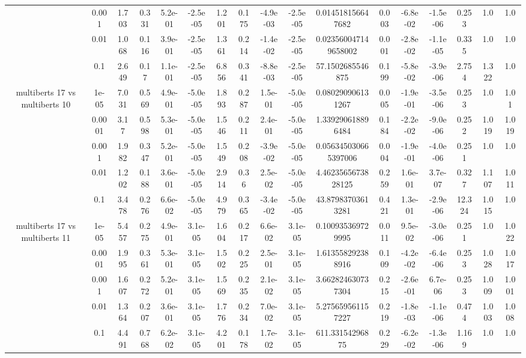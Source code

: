 \begin{tabular}{|c|c|c|c|c|c|c|c|c|c|c|c|c|c|c|c|c|}
 & 0.001 & 1.703 & 0.331 & 5.2e-01 & -2.5e-05 & 1.201 & 0.175 & -4.9e-03 & -2.5e-05 & 0.014518156647682 & 0.003 & -6.8e-02 & -1.5e-06 & 0.253 & 1.0 & 1.0 \\
 & 0.01 & 1.068 & 0.116 & 3.9e-01 & -2.5e-05 & 1.361 & 0.214 & -1.4e-02 & -2.5e-05 & 0.023560047149658002 & 0.001 & -2.8e-02 & -1.1e-05 & 0.335 & 1.0 & 1.0 \\
 & 0.1 & 2.649 & 0.17 & 1.1e-01 & -2.5e-05 & 6.856 & 0.341 & -8.8e-03 & -2.5e-05 & 57.1502685546875 & 0.199 & -5.8e-02 & -3.9e-06 & 2.754 & 1.322 & 1.0 \\
\hline
\multirow{5}{*}{multiberts 17 vs multiberts 10} & 1e-05 & 7.031 & 0.569 & 4.9e-01 & -5.0e-05 & 1.893 & 0.287 & 1.5e-01 & -5.0e-05 & 0.080290906131267 & 0.005 & -1.9e-01 & -3.5e-06 & 0.253 & 1.0 & 1.01 \\
 & 0.0001 & 3.17 & 0.598 & 5.3e-01 & -5.0e-05 & 1.546 & 0.211 & 2.4e-01 & -5.0e-05 & 1.339290618896484 & 0.184 & -2.2e-02 & -9.0e-06 & 0.252 & 1.019 & 1.019 \\
 & 0.001 & 1.982 & 0.347 & 5.2e-01 & -5.0e-05 & 1.549 & 0.208 & -3.9e-02 & -5.0e-05 & 0.056345030665397006 & 0.004 & -1.9e-01 & -4.0e-06 & 0.251 & 1.0 & 1.0 \\
 & 0.01 & 1.202 & 0.188 & 3.6e-01 & -5.0e-05 & 2.914 & 0.36 & 2.5e-02 & -5.0e-05 & 4.4623565673828125 & 0.259 & 1.6e-01 & 3.7e-07 & 0.327 & 1.107 & 1.011 \\
 & 0.1 & 3.478 & 0.276 & 6.6e-02 & -5.0e-05 & 4.979 & 0.365 & -3.4e-02 & -5.0e-05 & 43.87983703613281 & 0.421 & 1.3e-01 & -2.9e-06 & 12.324 & 1.015 & 1.0 \\
\hline
\multirow{5}{*}{multiberts 17 vs multiberts 11} & 1e-05 & 5.457 & 0.275 & 4.9e-01 & 3.1e-05 & 1.604 & 0.217 & 6.6e-02 & 3.1e-05 & 0.100935369729995 & 0.011 & 9.5e-02 & -3.0e-06 & 0.251 & 1.0 & 1.022 \\
 & 0.0001 & 1.995 & 0.361 & 5.3e-01 & 3.1e-05 & 1.502 & 0.225 & 2.5e-01 & 3.1e-05 & 1.613558292388916 & 0.109 & -4.2e-02 & -6.4e-06 & 0.253 & 1.028 & 1.017 \\
 & 0.001 & 1.607 & 0.272 & 5.2e-01 & 3.1e-05 & 1.569 & 0.235 & 2.1e-02 & 3.1e-05 & 3.662824630737304 & 0.215 & -2.6e-01 & 6.7e-06 & 0.253 & 1.009 & 1.001 \\
 & 0.01 & 1.364 & 0.207 & 3.6e-01 & 3.1e-05 & 1.776 & 0.234 & 7.0e-02 & 3.1e-05 & 5.275659561157227 & 0.219 & -1.8e-03 & -1.1e-06 & 0.474 & 1.003 & 1.008 \\
 & 0.1 & 4.491 & 0.768 & 6.2e-02 & 3.1e-05 & 4.201 & 0.178 & 1.7e-02 & 3.1e-05 & 611.33154296875 & 0.229 & -6.2e-02 & -1.3e-06 & 1.169 & 1.0 & 1.0 \\

\end{tabular}
